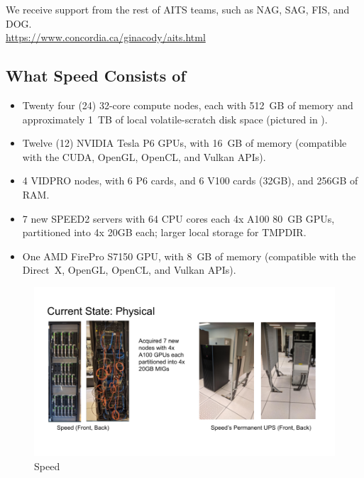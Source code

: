 \documentclass{easychair}
\begin{document}
\noindent
We receive support from the rest of AITS teams, such as NAG, SAG, FIS, and DOG.\\
%
\url{https://www.concordia.ca/ginacody/aits.html}

\subsection{What Speed Consists of}
\label{sect:speed-arch}

\begin{itemize}
\item
Twenty four (24) 32-core compute nodes, each with 512~GB of memory and 
approximately 1~TB of local volatile-scratch disk space (pictured in ).

\item
Twelve (12) NVIDIA Tesla P6 GPUs, with 16~GB of memory (compatible with the 
CUDA, OpenGL, OpenCL, and Vulkan APIs). 

\item
4 VIDPRO nodes, with 6 P6 cards, and 6 V100 cards (32GB), and 
256GB of RAM.

\item
7 new SPEED2 servers with 64 CPU cores each 4x A100 80~GB GPUs, partitioned
into 4x 20GB each; larger local storage for TMPDIR.

\item
One AMD FirePro S7150 GPU, with 8~GB of memory (compatible with the
Direct~X, OpenGL, OpenCL, and Vulkan APIs). 
\end{itemize}

\begin{figure}[htpb]
\includegraphics[width=\columnwidth]{images/speed-pics}
\caption{Speed}
\label{fig:speed-pics}
\end{figure}
\end{document}

